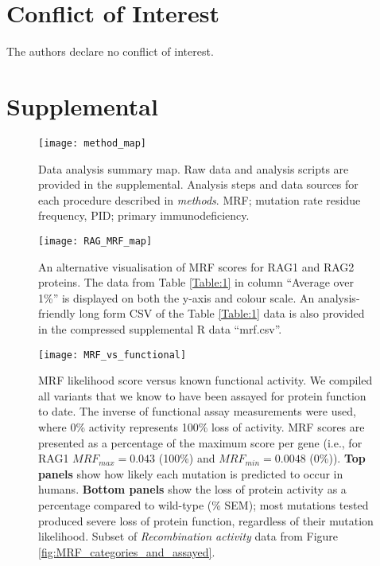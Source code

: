 \documentclass[preprint,11pt,fleqn]{elsarticle}
\newcommand{\beginsupplement}{%
        \setcounter{table}{0}
        \renewcommand{\thetable}{E\arabic{table}}%
        \setcounter{figure}{0}
        \renewcommand{\thefigure}{E\arabic{figure}}%
     }
\begin{document}
\section*{Conflict of Interest}
\noindent The authors declare no conflict of interest.


\section*{\refname}
	
%	
	
\pagebreak 



\beginsupplement
\section*{Supplemental}
 \label{sec:Supplemental_text}
 
 \begin{figure}[h]
	\texttt{[image: method\_map]}
	\caption{Data analysis summary map.
	Raw data and analysis scripts are provided in the supplemental. Analysis steps and data sources for each procedure described in \textit{methods}. 
	 MRF; mutation rate residue frequency, PID; primary immunodeficiency.}
	\label{fig:method_map}
\end{figure}

 \begin{figure}[h]
	\texttt{[image: RAG\_MRF\_map]}
	\caption{An alternative visualisation of MRF scores for RAG1 and RAG2 proteins.
	The data from Table \ref{Table:1} in column ``Average over 1\%'' is displayed on both the y-axis and colour scale. 
	An analysis-friendly long form CSV of the Table \ref{Table:1} data is also provided in the compressed supplemental R data ``mrf.csv''.}
  \label{fig:RAG_MRF_map}
\end{figure}

\begin{figure}[h]
	\hspace*{0cm} \texttt{[image: MRF\_vs\_functional]}
	\caption{MRF likelihood score versus known functional activity. 
We compiled all variants that we know to have been assayed for protein function to date.
The inverse of functional assay measurements were used, where 0\% activity represents 100\% loss of activity.
MRF scores are presented as a percentage of the maximum score per gene (i.e., for RAG1 $MRF_{max} = 0.043$ (100\%) and $MRF_{min} = 0.0048$ (0\%)). 	
\textbf{Top panels} show how likely each mutation is predicted to occur in humans. 
\textbf{Bottom panels} show the loss of protein activity  as a percentage compared to wild-type (\% SEM); most mutations tested produced severe loss of protein function, regardless of their mutation likelihood. Subset of \textit{Recombination activity} data from Figure \ref{fig:MRF_categories_and_assayed}.}
	\label{fig:Accuracy_MRF_vs_functional}
\end{figure}
\clearpage
\end{document}
